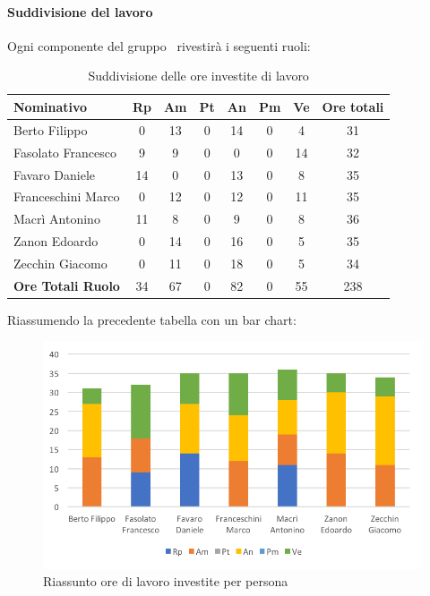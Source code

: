 \documentclass[../PianoDiProgetto.tex]{subfiles}
\begin{document}
			\paragraph{Suddivisione del lavoro}
			Ogni componente del gruppo \kpanic\ rivestirà i seguenti ruoli:
			\begin{table}[h]
				\begin{tabularx}{\textwidth}{l * {6}{C} c}
				\toprule
				\textbf{Nominativo} & \textbf{Rp} & \textbf{Am} & \textbf{Pt} & \textbf{An} & \textbf{Pm} & \textbf{Ve} & \textbf{Ore totali} \\
				\midrule
				Berto Filippo &	0 & 13 & 0 & 14 & 0 & 4 &  31 \\
				Fasolato Francesco & 9 & 9 & 0 & 0 & 0 & 14 & 32 \\
				Favaro Daniele & 14 & 0 & 0 & 13 & 0 & 8 & 35 \\
				Franceschini Marco & 0 & 12 & 0 & 12 & 0 & 11 & 35 \\
				Macrì Antonino & 11 & 8 & 0 & 9 & 0 & 8 & 36 \\
				Zanon Edoardo &	0 & 14 & 0 & 16 & 0 & 5 & 35 \\
				Zecchin Giacomo & 0 & 11 & 0 & 18 & 0 & 5 & 34 \\
				\midrule			
				\textbf{Ore Totali Ruolo} & 34 & 67 & 0 & 82 & 0 & 55 & 238 \\
				\bottomrule
				\end{tabularx}
				\caption{Suddivisione delle ore investite di lavoro}		
			\end{table}

			Riassumendo la precedente tabella con un bar chart:	
			\begin{figure}[!h]
				\centering
				\includegraphics[width=\textwidth]{Preventivo//Immagini/investito_oreRuoloPersona.png}
				\caption{Riassunto ore di lavoro investite per persona}
			\end{figure}	
			
\end{document}
